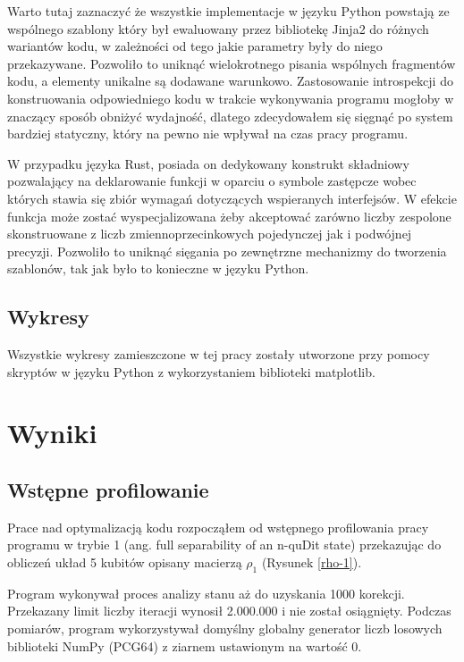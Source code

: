 \documentclass[11pt, a4paper]{article}
\begin{document}
\begin{sloppypar}
    Warto tutaj zaznaczyć że wszystkie implementacje w języku Python powstają ze
    wspólnego szablony który był ewaluowany przez bibliotekę Jinja2 do różnych wariantów
    kodu, w zależności od tego jakie parametry były do niego przekazywane. Pozwoliło to
    uniknąć wielokrotnego pisania wspólnych fragmentów kodu, a elementy unikalne są dodawane
    warunkowo. Zastosowanie introspekcji do konstruowania odpowiedniego kodu w trakcie
    wykonywania programu mogłoby w znaczący sposób obniżyć wydajność, dlatego zdecydowałem
    się sięgnąć po system bardziej statyczny, który na pewno nie wpływał na czas pracy
    programu.

    W przypadku języka Rust, posiada on dedykowany konstrukt składniowy pozwalający na deklarowanie
    funkcji w oparciu o symbole zastępcze wobec których stawia się zbiór wymagań dotyczących
    wspieranych interfejsów. W efekcie funkcja może zostać wyspecjalizowana żeby
    akceptować zarówno liczby zespolone skonstruowane z liczb zmiennoprzecinkowych
    pojedynczej jak i podwójnej precyzji. Pozwoliło to uniknąć sięgania po zewnętrzne mechanizmy
    do tworzenia szablonów, tak jak było to konieczne w języku Python.

    \subsection{Wykresy}
    Wszystkie wykresy zamieszczone w tej pracy zostały utworzone przy pomocy skryptów w
    języku Python z wykorzystaniem biblioteki matplotlib\cite{Hunter:2007}.

    \section{Wyniki}
    \subsection{Wstępne profilowanie}
    Prace nad optymalizacją kodu rozpocząłem od wstępnego profilowania pracy programu w trybie
    1 (ang. full separability of an n-quDit state) przekazując do obliczeń układ 5
    kubitów opisany macierzą $\rho_{1}$ (Rysunek \ref{rho-1}).

    Program wykonywał proces analizy stanu aż do uzyskania 1000 korekcji. Przekazany limit
    liczby iteracji wynosił 2.000.000 i nie został osiągnięty. Podczas pomiarów, program
    wykorzystywał domyślny globalny generator liczb losowych biblioteki NumPy (PCG64\cite{NumpyDefaultGenerator})
    z ziarnem ustawionym na wartość 0.


\end{sloppypar}
\end{document}
